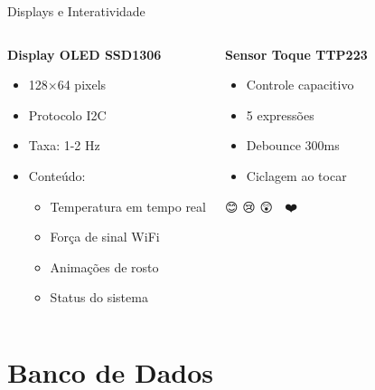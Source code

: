 \documentclass[12pt,aspectratio=16:9]{beamer}
\begin{document}
\begin{frame}{Displays e Interatividade}
    \begin{columns}
        \begin{block}{\textbf{Display OLED SSD1306}}
            \begin{itemize}
                \item 128×64 pixels
                \item Protocolo I2C
                \item Taxa: 1-2 Hz
                \item Conteúdo:
                \begin{itemize}
                    \item Temperatura em tempo real
                    \item Força de sinal WiFi
                    \item Animações de rosto
                    \item Status do sistema
                \end{itemize}
            \end{itemize}
        \end{block}
        
        \begin{block}{\textbf{Sensor Toque TTP223}}
            \begin{itemize}
                \item Controle capacitivo
                \item 5 expressões
                \item Debounce 300ms
                \item Ciclagem ao tocar
            \end{itemize}
            
            \vspace{0.5cm}
            
            \centering
            \small
            😊 😢 😲 🤔 ❤️
        \end{block}
    \end{columns}
\end{frame}

\section{Banco de Dados}
\end{document}
